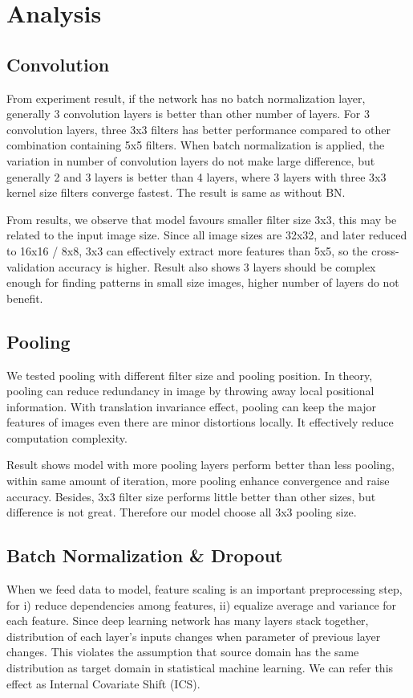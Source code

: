 \documentclass[journal,onecolumn]{IEEEtran}
\begin{document}
\section{Analysis}
\subsection{Convolution}
From experiment result, if the network has no batch normalization layer, generally 3 convolution layers is better than other number of layers. For 3 convolution layers, three 3x3 filters has better performance compared to other combination containing 5x5 filters. When batch normalization is applied, the variation in number of convolution layers do not make large difference, but generally 2 and 3 layers is better than 4 layers, where 3 layers with three 3x3 kernel size filters converge fastest. The result is same as without BN. 

From results, we observe that model favours smaller filter size 3x3, this may be related to the input image size. Since all image sizes are 32x32, and later reduced to 16x16 / 8x8, 3x3 can effectively extract more features than 5x5, so the cross-validation accuracy is higher. Result also shows 3 layers should be complex enough for finding patterns in small size images, higher number of layers do not benefit.

\subsection{Pooling}
We tested pooling with different filter size and pooling position. In theory, pooling can reduce redundancy in image by throwing away local positional information. With translation invariance effect, pooling can keep the major features of images even there are minor distortions locally. It effectively reduce computation complexity.

Result shows model with more pooling layers perform better than less pooling, within same amount of iteration, more pooling enhance convergence and raise accuracy. Besides, 3x3 filter size performs little better than other sizes, but difference is not great. Therefore our model choose all 3x3 pooling size.


\subsection{Batch Normalization \& Dropout}
When we feed data to model, feature scaling is an important preprocessing step, for i) reduce dependencies among features, ii) equalize average and variance for each feature. Since deep learning network has many layers stack together, distribution of each layer’s inputs changes when parameter of previous layer changes. This violates the assumption that source domain has the same distribution as target domain in statistical machine learning. We can refer this effect as Internal Covariate Shift (ICS). \cite{bn_paper}
\end{document}
